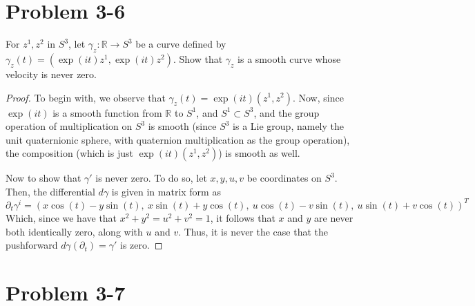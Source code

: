 \documentclass[fontsize=11pt]{scrartcl} %
\numberwithin{equation}{section} %
\numberwithin{figure}{section} %
\numberwithin{table}{section} %
\newcommand{\R}{\mathbb{R}}
\begin{document}
\section*{Problem 3-6}
For $z^1, z^2$ in $S^3$, let $\gamma_z:\R\to S^3$ be a curve defined by
$\gamma_z(t) = (\exp(it)z^1,\exp(it)z^2)$. Show that $\gamma_z$ is a smooth curve whose
velocity is never zero.
\\
\begin{proof}
To begin with, we observe that $\gamma_z(t) = \exp(it)(z^1,z^2)$. Now, since $\exp(it)$ is
a smooth function from $\R$ to $S^1$, and $S^1\subset S^3$, and the group operation
of multiplication on $S^3$ is smooth (since $S^3$ is a Lie group, namely the unit quaternionic
sphere, with quaternion multiplication as the group operation), the composition 
(which is just $\exp(it)(z^1,z^2)$)
is smooth as well.

Now to show that $\gamma'$ is never zero. To do so, let $x,y,u,v$ be coordinates
on $S^3$. Then, the differential $d\gamma$ is given in matrix form as
\[
\partial_t \gamma^i = \left(x\cos(t) - y\sin(t),\ x\sin(t)+y\cos(t),\ u\cos(t) - v\sin(t),\ u\sin(t) + v\cos(t)\right)^T
\]
Which, since we have that $x^2 + y^2 = u^2 + v^2 = 1$, it follows that $x$ and $y$ are
never both identically zero, along with $u$ and $v$. Thus, it is never the 
case that the pushforward $d\gamma(\partial_t) = \gamma'$ is zero.
\end{proof}
\pagebreak
\section*{Problem 3-7}



\pagebreak
\end{document}
